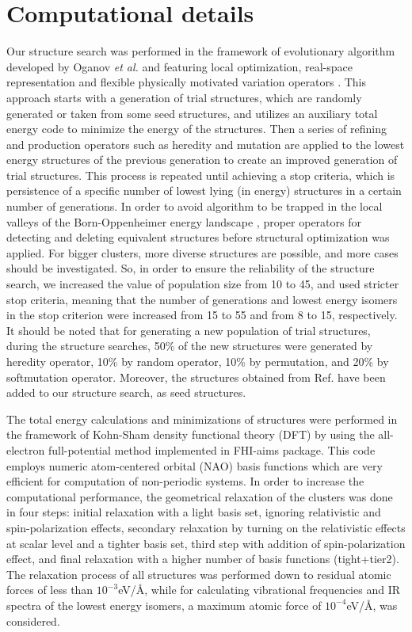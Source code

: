 \documentclass[nofootinbib,10pt,aip,twocolumn,showpacs]{revtex4-1}
\begin{document}
\section{Computational details}

Our structure search was performed in the framework of evolutionary algorithm 
developed by Oganov \textit{et al.} and 
featuring local optimization, real-space representation and flexible 
physically motivated variation operators \cite{oganov2006c,lyakhov2013,oganov2011h}. 
This approach starts with a generation of trial structures,
which are randomly generated or taken from some seed structures,
and utilizes an auxiliary total energy code to minimize the energy of the structures.
Then a series of refining and production operators such as 
heredity and mutation are applied to the lowest energy structures of 
the previous generation to create an improved generation of trial structures.
This process is repeated until achieving a stop criteria, 
which is persistence of a specific number of lowest lying (in energy) structures 
in a certain number of generations.
In order to avoid algorithm to be trapped in the local valleys of 
the Born-Oppenheimer energy landscape \cite{glass2006,lyakhov2013},
proper operators for detecting and deleting equivalent structures before 
structural optimization was applied.
For bigger clusters, more diverse structures are possible, and more cases should be investigated.
So, in order to ensure the reliability of the structure search, we increased the value of population size
from 10 to 45, and used stricter stop criteria,
meaning that the number of generations and lowest energy isomers in 
the stop criterion were increased from 15 to 55 and from 8 to 15, respectively.
It should be noted that for generating a new population of trial structures,
during the structure searches, 50\% of the new structures were generated by heredity operator,
10\% by random operator, 10\% by permutation, and 20\% by softmutation operator.
Moreover, the structures obtained from Ref.\cite{murugan2005a} have been added to our structure search,
as seed structures.

The total energy calculations and minimizations of structures were performed in the framework 
of Kohn-Sham density functional theory (DFT) by using the all-electron full-potential method 
implemented in FHI-aims package\cite{blum2009ab,ren2012resolution}. 
This code employs numeric atom-centered orbital (NAO) basis functions 
which are very efficient for computation of non-periodic systems.
In order to increase the computational performance, the geometrical relaxation of 
the clusters was done in four steps: 
initial relaxation with a light basis set, ignoring relativistic and spin-polarization effects,
secondary relaxation by turning on the relativistic effects at scalar level and a tighter basis set, 
third step with addition of spin-polarization effect,
and final relaxation with a higher number of basis functions (tight+tier2).
The relaxation process of all structures was performed down to 
residual atomic forces of less than $10^{-3}$eV/\AA,
while for calculating vibrational frequencies and IR spectra of 
the lowest energy isomers, a maximum atomic force of $10^{-4}$eV/\AA, was considered.
\end{document}
